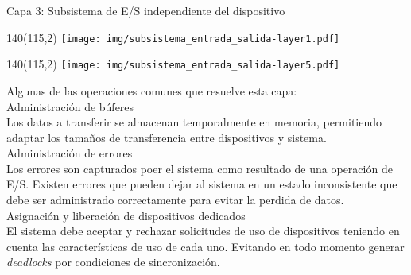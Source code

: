 \documentclass[aspectratio=169]{beamer}
\begin{document}
\begin{frame}{Capa 3: Subsistema de E/S independiente del dispositivo}
    \begin{textblock}{140}(115,2) \texttt{[image: img/subsistema\_entrada\_salida-layer1.pdf]} \end{textblock}
    \begin{textblock}{140}(115,2) \texttt{[image: img/subsistema\_entrada\_salida-layer5.pdf]} \end{textblock}
    Algunas de las operaciones comunes que resuelve esta capa:\\
    \bigskip
    \small
    \textcolor{naranjauca}{Administración de búferes}\\
    Los datos a transferir se almacenan temporalmente en memoria, permitiendo adaptar los tamaños de transferencia entre dispositivos y sistema.\\
    \bigskip
    \pause
    \textcolor{naranjauca}{Administración de errores}\\
    Los errores son capturados poer el sistema como resultado de una operación de E/S.
    Existen errores que pueden dejar al sistema en un estado inconsistente que debe ser administrado correctamente para evitar la perdida de datos.\\
    \bigskip
    \pause
    \textcolor{naranjauca}{Asignación y liberación de dispositivos dedicados}\\
    El sistema debe aceptar y rechazar solicitudes de uso de dispositivos teniendo en cuenta las características de uso de cada uno.
    Evitando en todo momento generar \emph{deadlocks} por condiciones de sincronización.
\end{frame}
\end{document}
